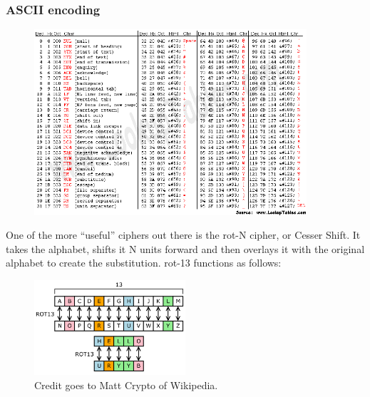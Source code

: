 \documentclass{beamer}
\begin{document}
\begin{frame}
    \frametitle{ASCII encoding}
    \begin{figure}[h]
        \includegraphics[width=0.9\textwidth]{asciifull}
    \end{figure}
\end{frame}

\begin{frame}

    One of the more ``useful'' ciphers out there is the rot-N cipher, or Cesser
    Shift. It takes the alphabet, shifts it N units forward and then overlays it
    with the original alphabet to create the substitution. rot-13 functions as
    follows:

    \begin{figure}[h]
        \begin{center}
            \includegraphics[width=0.5\textwidth]{ROT13}
        \end{center}
        \caption{Credit goes to Matt Crypto of Wikipedia.}
    \end{figure}
\end{frame}
\end{document}
